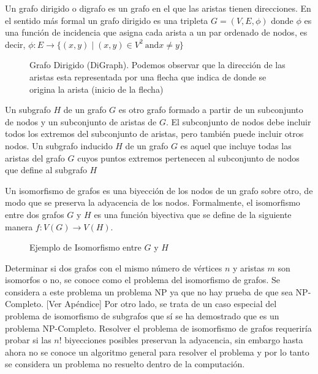Un grafo dirigido o digrafo es un grafo en el que las aristas tienen direcciones. En el sentido más formal un grafo dirigido es una tripleta $G = (V,E,\phi)$ donde $\phi$ es una función de incidencia que asigna cada arista a un par ordenado de nodos, es decir, $ \phi :E \to \{(x,y)\mid (x,y)\in V^{2}\ \textrm{and} x \neq y \}$

 \begin{figure}[htbp]
   \centering
   
    \caption{Grafo Dirigido (DiGraph). Podemos observar que la dirección de las aristas esta representada por una flecha que indica de donde se origina la arista (inicio de la flecha) }
    \label{fig:digraph}
\end{figure}

Un subgrafo $H$ de un grafo $G$ es otro grafo formado a partir de un subconjunto de nodos y un subconjunto de aristas de $G$. El subconjunto de nodos debe incluir todos los extremos del subconjunto de aristas, pero también puede incluir otros nodos. Un subgrafo inducido $H$ de un grafo $G$ es aquel que incluye todas las aristas del grafo $G$ cuyos puntos extremos pertenecen al subconjunto de nodos que define al subgrafo $H$

Un isomorfismo de grafos es una biyección de los nodos de un grafo sobre otro, de modo que se preserva la adyacencia de los nodos. Formalmente, el isomorfismo entre dos grafos $G$ y $H$ es una función biyectiva que se define de la siguiente manera $f:V(G) \rightarrow V(H)$.

\label{subsection:isomorphism}

 \begin{figure}[htbp]
   \centering
   
    \caption{Ejemplo de Isomorfismo entre $G$ y $H$}
    \label{fig:isomorphism}
\end{figure}

Determinar si dos grafos con el mismo número de vértices $n$ y aristas $m$ son isomorfos o no, se conoce como el problema del isomorfismo de grafos. Se considera a este problema un problema NP ya que no hay prueba de que sea NP-Completo. \cite{kobler_graph_1993} [Ver Apéndice] Por otro lado, se trata de un caso especial del problema de isomorfismo de subgrafos que sí se ha demostrado que es un problema NP-Completo. Resolver el problema de isomorfismo de grafos requeriría probar si las $n!$ biyecciones posibles preservan la adyacencia, sin embargo hasta ahora no se conoce un algoritmo general para resolver el problema y por lo tanto se considera un problema no resuelto dentro de la computación.

